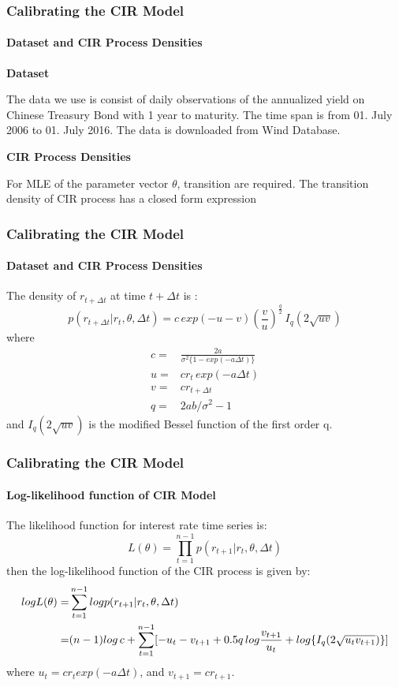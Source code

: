 \documentclass[11pt]{beamer}
\begin{document}
	\begin{frame}
		\frametitle{Calibrating the CIR Model}
		\framesubtitle{Dataset and CIR Process Densities}
		\textbf{Dataset}
		\newline
		
		The data we use is consist of daily observations of the annualized yield on Chinese Treasury Bond with 1 year to maturity. The time span is from 01. July 2006 to 01. July 2016. The data is downloaded from Wind Database.	
		\newline
		
		\textbf{CIR Process Densities}
		\newline
			
		For MLE of the parameter vector $ \theta $, transition are required. The transition density of CIR process has a closed form expression			
	\end{frame}
	
	
	\begin{frame}
		\frametitle{Calibrating the CIR Model}
		\framesubtitle{Dataset and CIR Process Densities}
		The density of $ r_{t+\Delta t} $ at time $ t+\Delta t $ is :
		\[
		p(r_{t+\Delta t}|r_t,\theta,\Delta t)=c\, exp(-u-v)(\frac{v}{u})^{\frac{q}{2}} \,I_q(2\sqrt{uv})
		\]
		where
		\begin{align*}
		c=& \frac{2a}{\sigma^2\{1-exp(-a\Delta t)\}} \\
		u=& cr_t \,exp(-a\Delta t) \\
		v=& cr_{t+\Delta t} \\
		q=& 2ab/\sigma^2-1
		\end{align*}
		and $ I_q(2\sqrt{uv}) $ is the modified Bessel function of the first order q.			
	\end{frame}
	
	
	\begin{frame}
		\frametitle{Calibrating the CIR Model}
		\framesubtitle{Log-likelihood function of CIR Model}
		The likelihood function for interest rate time series is:
		\[
		L(\theta)=\prod_{t=1}^{n-1}p(r_{t+1}|r_t,\theta,\Delta t)
		\]
		then the log-likelihood function of the CIR process is given by:
		\begin{align}
		logL(\theta)=& \sum_{t=1}^{n-1}logp(r_{t+1}|r_t,\theta,\Delta t) \notag \\
		=& (n-1)log\,c+\sum_{t=1}^{n-1}[-u_t-v_{t+1}+0.5q\,log\frac{v_{t+1}}{u_t}+log\{I_q(2\sqrt{u_tv_{t+1}})\}]
		\end{align}
		where $ u_t=cr_texp(-a\Delta t) $, and $ v_{t+1}=cr_{t+1} $.			
	\end{frame}
	
\end{document}
